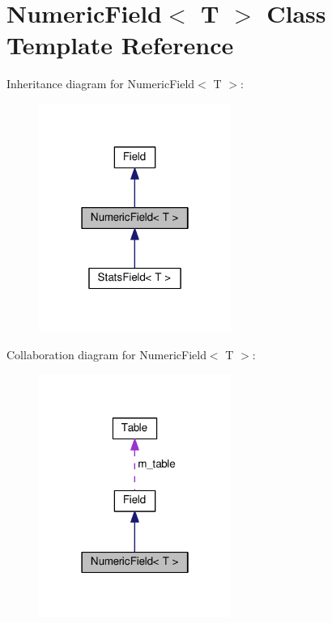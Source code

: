 \hypertarget{classNumericField}{}\section{Numeric\+Field$<$ T $>$ Class Template Reference}
\label{classNumericField}


Inheritance diagram for Numeric\+Field$<$ T $>$\+:\nopagebreak
\begin{figure}[H]
\begin{center}
\leavevmode
\includegraphics[width=178pt]{classNumericField__inherit__graph}
\end{center}
\end{figure}


Collaboration diagram for Numeric\+Field$<$ T $>$\+:\nopagebreak
\begin{figure}[H]
\begin{center}
\leavevmode
\includegraphics[width=178pt]{classNumericField__coll__graph}
\end{center}
\end{figure}
